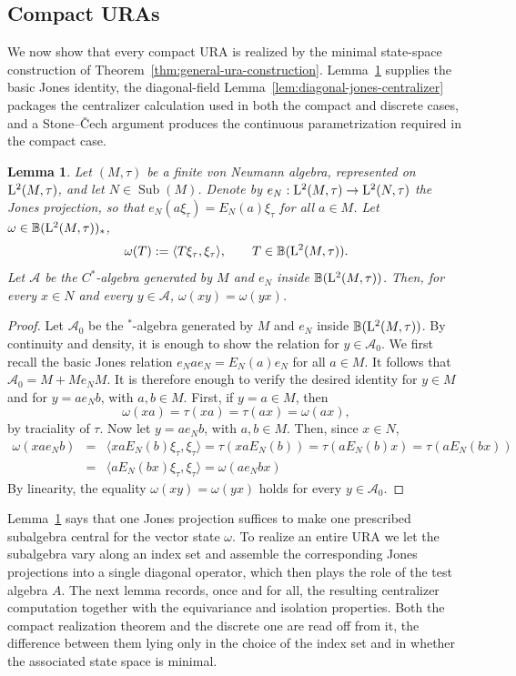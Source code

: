 \documentclass[12pt]{amsart} %
\theoremstyle{plain}
\newtheorem{lemma}[theorem]{Lemma}
\theoremstyle{definition}
\newcommand{\B}{\mathbb{B}}
\newcommand{\LL}{{\rm L}}
\begin{document}
\subsection{Compact URAs}
\label{subsec:compactURAs}
We now show that every compact URA is realized by the minimal
state-space construction of Theorem~\ref{thm:general-ura-construction}.
Lemma~\ref{LemJones} supplies the basic Jones identity, the diagonal-field
Lemma~\ref{lem:diagonal-jones-centralizer} packages the centralizer
calculation used in both the compact and discrete cases, and a
Stone--\v{C}ech argument produces the continuous parametrization required
in the compact case.
\begin{lemma}\label{LemJones}
Let \((M,\tau)\) be a finite von Neumann algebra, represented on
\(\LL^2(M,\tau)\), and let \(N\in\operatorname{Sub}(M)\). Denote by $e_N:\LL^2(M,\tau)\to \LL^2(N,\tau)$ the Jones projection, so that $e_N(a\xi_\tau)=E_N(a)\xi_\tau$ for all $a\in {M}$. Let $\omega\in \B(\LL^2(M,\tau))_*$,
\[
        \omega(T):=\langle T\xi_\tau,\xi_\tau\rangle,
        \qquad T\in \B(\LL^2(M,\tau)).
\]
Let \(\mathcal A\) be the $C^*$-algebra generated by \(M\) and
\(e_N\) inside \(\B(\LL^2(M,\tau))\). Then, for every \(x\in N\) and every
\(y\in\mathcal A\), $\omega(xy)=\omega(yx)$.\end{lemma}
\begin{proof}
Let \(\mathcal A_0\) be the \(^*\)-algebra generated by \(M\) and
\(e_N\) inside \(\B(\LL^2(M,\tau))\). By continuity and density, it is enough to show the relation for $y\in\mathcal{A}_0$. We first recall the basic Jones relation $e_Nae_N=E_N(a)e_N$ for all $a\in M$. It follows that $\mathcal{A}_0=M+Me_NM$. It is therefore enough to verify the desired identity for \(y\in M\) and for
\(y=ae_Nb\), with \(a,b\in M\). First, if \(y=a\in M\), then
\[
        \omega(xa)
        =
        \tau(xa)
        =
        \tau(ax)
        =
        \omega(ax),
\]
by traciality of \(\tau\). Now let \(y=ae_Nb\), with \(a,b\in M\). Then, since $x\in N$,
\begin{eqnarray*}
        \omega(xae_Nb)
        &=&
        \langle xaE_N(b)\xi_\tau,\xi_\tau\rangle
        =
        \tau(xaE_N(b))= \tau(aE_N(b)x)=\tau(aE_N(bx))\\
        &=&\langle aE_N(bx)\xi_\tau,\xi_\tau\rangle= \omega(ae_Nbx)
\end{eqnarray*}
By linearity, the equality $\omega(xy)=\omega(yx)$ holds for every \(y\in\mathcal{A}_0\).\end{proof}

\noindent Lemma~\ref{LemJones} says that one Jones projection suffices to make
one prescribed subalgebra central for the vector state $\omega$. To realize an
entire URA we let the subalgebra vary along an index set and assemble the
corresponding Jones projections into a single diagonal operator, which then plays
the role of the test algebra $A$. The next lemma records, once and for all, the
resulting centralizer computation together with the equivariance and isolation
properties. Both the compact realization theorem and the discrete one are read
off from it, the difference between them lying only in the choice of the index
set and in whether the associated state space is minimal.
\medskip
\end{document}

